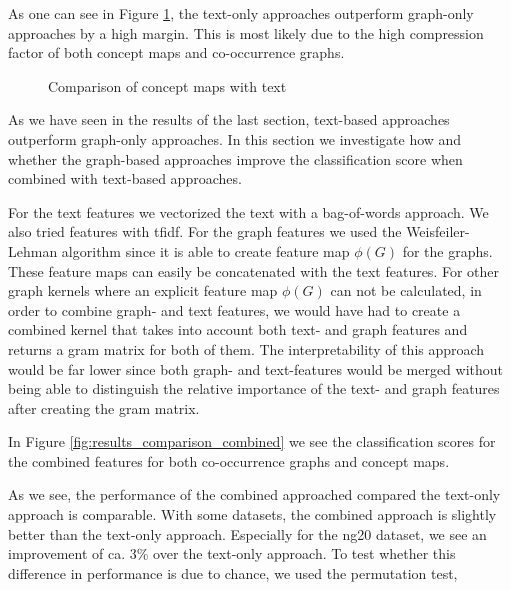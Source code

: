 As one can see in Figure \ref{fig:results_cmap_vs_text}, the text-only approaches outperform graph-only approaches by a high margin.
This is most likely due to the high compression factor of both concept maps and co-occurrence graphs.

\begin{figure}[ht]
\centering
\missingfigure[figcolor=white]{}
\caption{Comparison of concept maps with text}
\label{fig:results_cmap_vs_text}
\end{figure}


As we have seen in the results of the last section, text-based approaches outperform graph-only approaches.
In this section we investigate how and whether the graph-based approaches improve the classification score when combined with text-based approaches.

For the text features we vectorized the text with a bag-of-words approach. We also tried features with tfidf.
For the graph features we used the Weisfeiler-Lehman algorithm since it is able to create feature map $\phi(G)$ for the graphs.
These feature maps can easily be concatenated with the text features.
For other graph kernels where an explicit feature map $\phi(G)$ can not be calculated, in order to combine graph- and text features, we would have had to create a combined kernel that takes into account both text- and graph features and returns a gram matrix for both of them.
The interpretability of this approach would be far lower since both graph- and text-features would be merged without being able to distinguish the relative importance of the text- and graph features after creating the gram matrix.

In Figure \ref{fig:results_comparison_combined} we see the classification scores for the combined features for both co-occurrence graphs and concept maps.

As we see, the performance of the combined approached compared the text-only approach is comparable.
With some datasets, the combined approach is slightly better than the text-only approach. Especially for the ng20 dataset, we see an improvement of ca. 3\% over the text-only approach.
To test whether this difference in performance is due to chance, we used the permutation test, 

